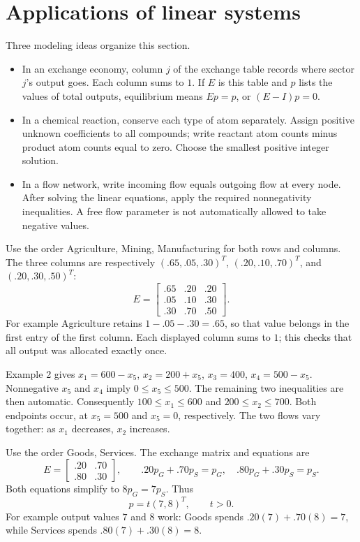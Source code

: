 \section{Applications of linear systems}
Three modeling ideas organize this section.
\begin{itemize}
\item In an exchange economy, column $j$ of the exchange table records
where sector $j$'s output goes. Each column sums to $1$.
If $E$ is this table and $p$ lists the values of total outputs,
equilibrium means $Ep=p$, or $(E-I)p=0$.
\item In a chemical reaction, conserve each type of atom separately.
Assign positive unknown coefficients to all compounds; write
reactant atom counts minus product atom counts equal to zero.
Choose the smallest positive integer solution.
\item In a flow network, write incoming flow equals outgoing flow
at every node. After solving the linear equations, apply the required
nonnegativity inequalities. A free flow parameter is not automatically
allowed to take negative values.
\end{itemize}

Use the order Agriculture, Mining, Manufacturing for both rows and
columns. The three columns are respectively
$(.65,.05,.30)^T$, $(.20,.10,.70)^T$, and $(.20,.30,.50)^T$:
\[E=\begin{bmatrix}.65&.20&.20\\.05&.10&.30\\.30&.70&.50\end{bmatrix}.\]
For example Agriculture retains $1-.05-.30=.65$, so that value belongs
in the first entry of the first column. Each displayed column sums to $1$;
this checks that all output was allocated exactly once.

Example 2 gives $x_1=600-x_5$, $x_2=200+x_5$,
$x_3=400$, $x_4=500-x_5$. Nonnegative $x_5$ and $x_4$ imply
$0\le x_5\le500$. The remaining two inequalities are then automatic.
Consequently $100\le x_1\le600$ and $200\le x_2\le700$.
Both endpoints occur, at $x_5=500$ and $x_5=0$, respectively.
The two flows vary together: as $x_1$ decreases, $x_2$ increases.

Use the order Goods, Services. The exchange matrix and equations are
\[E=\begin{bmatrix}.20&.70\\.80&.30\end{bmatrix},\qquad
.20p_G+.70p_S=p_G,\quad .80p_G+.30p_S=p_S.\]
Both equations simplify to $8p_G=7p_S$. Thus
\[p=t(7,8)^T,\qquad t>0.\]
For example output values $7$ and $8$ work: Goods spends
$.20(7)+.70(8)=7$, while Services spends $.80(7)+.30(8)=8$.

